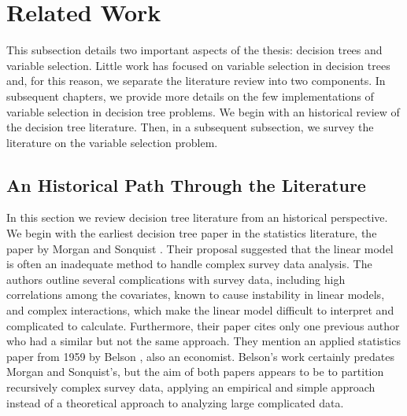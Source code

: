 \section{Related Work}
\label{ch:related}


This subsection details two important aspects of the thesis: decision trees and variable selection. Little work has focused on variable selection in decision trees and, for this reason, we separate the literature review into two components. In subsequent chapters, we provide more details on the few implementations of variable selection in decision tree problems. We begin with an historical review of the decision tree literature. Then, in a subsequent subsection, we survey the literature on the variable selection problem. 

\subsection{An Historical Path Through the Literature}

In this section we review decision tree literature from an historical perspective. We begin with the earliest decision tree paper in the statistics literature, the paper by Morgan and Sonquist \cite{morgan1963problems}. Their proposal suggested that the linear model is often an inadequate method to handle complex survey data analysis. The authors outline several complications with survey data, including high correlations among the covariates, known to cause instability in linear models, and complex interactions, which make the linear model difficult to interpret and complicated to calculate. Furthermore, their paper cites only one previous author who had a similar but not the same approach. They mention an applied statistics paper from 1959 by Belson \cite{belson1959matching}, also an economist. Belson's work certainly predates Morgan and Sonquist's, but the aim of both papers appears to be to partition recursively complex survey data, applying an empirical and simple approach instead of a theoretical approach to analyzing large complicated data. 

